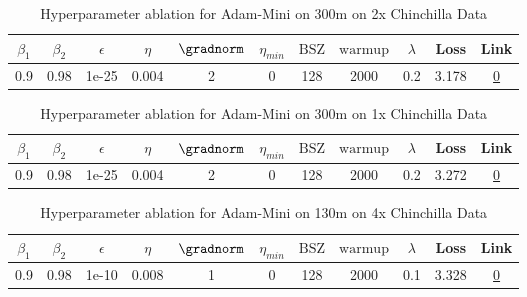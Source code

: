 \begin{table}[H]
\centering
\caption{Hyperparameter ablation for Adam-Mini on 300m on 2x Chinchilla Data}
\label{tab:ablation_adam-mini_300m_2}
\begin{tabular}{ccccccccccc}
\toprule
$\beta_1$ & $\beta_2$ & $\epsilon$ & $\eta$ & $\gradnorm$ & $\eta_{min}$ & $\mathrm{BSZ}$ & $\mathrm{warmup}$ & $\lambda$ & Loss & Link \\
\midrule
0.9 & 0.98 & 1e-25 & 0.004 & 2 & 0 & 128 & 2000 & 0.2 & 3.178 & \href{https://wandb.ai/stanford-mercury/optimizer-scaling/runs/sweep-300m-12B-mini9676c0lr0.004-wd0.2-minlr0-warmup2000-b10.9-b-80350d}{0} \\
\midrule
\bottomrule
\end{tabular}
\end{table}

\begin{table}[H]
\centering
\caption{Hyperparameter ablation for Adam-Mini on 300m on 1x Chinchilla Data}
\label{tab:ablation_adam-mini_300m_1}
\begin{tabular}{ccccccccccc}
\toprule
$\beta_1$ & $\beta_2$ & $\epsilon$ & $\eta$ & $\gradnorm$ & $\eta_{min}$ & $\mathrm{BSZ}$ & $\mathrm{warmup}$ & $\lambda$ & Loss & Link \\
\midrule
0.9 & 0.98 & 1e-25 & 0.004 & 2 & 0 & 128 & 2000 & 0.2 & 3.272 & \href{https://wandb.ai/stanford-mercury/optimizer-scaling/runs/sweep-300m-6B-minimf93988lr0.004-wd0.2-minlr0-warmup2000-b10.9-b-1a622b}{0} \\
\midrule
\bottomrule
\end{tabular}
\end{table}

\begin{table}[H]
\centering
\caption{Hyperparameter ablation for Adam-Mini on 130m on 4x Chinchilla Data}
\label{tab:ablation_adam-mini_130m_4}
\begin{tabular}{ccccccccccc}
\toprule
$\beta_1$ & $\beta_2$ & $\epsilon$ & $\eta$ & $\gradnorm$ & $\eta_{min}$ & $\mathrm{BSZ}$ & $\mathrm{warmup}$ & $\lambda$ & Loss & Link \\
\midrule
0.9 & 0.98 & 1e-10 & 0.008 & 1 & 0 & 128 & 2000 & 0.1 & 3.328 & \href{https://wandb.ai/stanford-mercury/optimizer-scaling/runs/sweep-130m-10B-mini8e0689lr0.008-wd0.1-minlr0-warmup2000-b10.9-b-1de787}{0} \\
\midrule
\bottomrule
\end{tabular}
\end{table}

